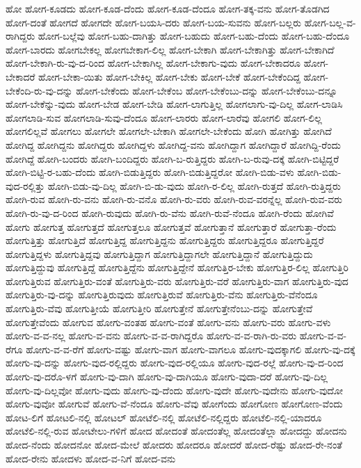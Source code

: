 {ಹೋ
ಹೋಗ-ಕೂಡದು
ಹೋಗ-ಕೂಡ-ದೆಂದು
ಹೋಗ-ಕೂಡ-ದೆಂದೂ
ಹೋಗ-ತಕ್ಕ-ವನು
ಹೋಗ-ತೊಡಗಿದ
ಹೋಗ-ದಂತೆ
ಹೋಗದೆ
ಹೋಗದೇ
ಹೋಗ-ಬಯಸಿ-ದರು
ಹೋಗ-ಬಯ-ಸುವನು
ಹೋಗ-ಬಲ್ಲರು
ಹೋಗ-ಬಲ್ಲ-ವ-ರಾಗಿದ್ದರು
ಹೋಗ-ಬಲ್ಲೆವು
ಹೋಗ-ಬಹು-ದಾಗಿತ್ತು
ಹೋಗ-ಬಹುದು
ಹೋಗ-ಬಹು-ದೆಂದು
ಹೋಗ-ಬಹು-ದೆಂದೂ
ಹೋಗ-ಬಾರದು
ಹೋಗಬೇಕಲ್ಲ
ಹೋಗಬೇಕಾಗ-ಲಿಲ್ಲ
ಹೋಗ-ಬೇಕಾಗಿ
ಹೋಗ-ಬೇಕಾಗಿತ್ತು
ಹೋಗ-ಬೇಕಾಗಿದೆ
ಹೋಗ-ಬೇಕಾಗಿ-ರು-ವು-ದ-ರಿಂದ
ಹೋಗ-ಬೇಕಾಗಿಲ್ಲ
ಹೋಗ-ಬೇಕಾಗು-ವುದು
ಹೋಗ-ಬೇಕಾದರೂ
ಹೋಗ-ಬೇಕಾದರೆ
ಹೋಗ-ಬೇಕಾ-ಯಿತು
ಹೋಗ-ಬೇಕಿಲ್ಲ
ಹೋಗ-ಬೇಕು
ಹೋಗ-ಬೇಕೆ
ಹೋಗ-ಬೇಕೆಂದಿದ್ದ
ಹೋಗ-ಬೇಕೆಂದಿ-ರು-ವು-ದನ್ನು
ಹೋಗ-ಬೇಕೆಂದು
ಹೋಗ-ಬೇಕೆಂಬ
ಹೋಗ-ಬೇಕೆಂಬು-ದನ್ನು
ಹೋಗ-ಬೇಕೆಂಬು-ದನ್ನೂ
ಹೋಗ-ಬೇಕೆನ್ನು-ವುದು
ಹೋಗ-ಬೇಡ
ಹೋಗ-ಬೇಡಿ
ಹೋಗ-ಲಾಗುತ್ತಿಲ್ಲ
ಹೋಗಲಾಗು-ವು-ದಿಲ್ಲ
ಹೋಗ-ಲಾಡಿಸಿ
ಹೋಗಲಾಡಿ-ಸುವ
ಹೋಗಲಾಡಿ-ಸುವು-ದೆಂದೂ
ಹೋಗ-ಲಾರರು
ಹೋಗ-ಲಾರೆವು
ಹೋಗಲಿ
ಹೋಗ-ಲಿಲ್ಲ
ಹೋಗಲಿಲ್ಲವೆ
ಹೋಗಲು
ಹೋಗಲೇ
ಹೋಗಲೇ-ಬೇಕಾಗಿ
ಹೋಗಲೇ-ಬೇಕೆಂದು
ಹೋಗಿ
ಹೋಗಿತ್ತು
ಹೋಗಿದೆ
ಹೋಗಿದ್ದ
ಹೋಗಿದ್ದನು
ಹೋಗಿದ್ದರು
ಹೋಗಿದ್ದಳು
ಹೋಗಿದ್ದ-ವನು
ಹೋಗಿದ್ದಾಗ
ಹೋಗಿದ್ದಾರೆ
ಹೋಗಿದ್ದಿ-ರೆಂದು
ಹೋಗಿದ್ದೆ
ಹೋಗಿ-ಬಂದರು
ಹೋಗಿ-ಬಂದಿದ್ದರು
ಹೋಗಿ-ಬ-ರುತ್ತಿದ್ದರು
ಹೋಗಿ-ಬ-ರುವು-ದಕ್ಕೆ
ಹೋಗಿ-ಬಿಟ್ಟಿದ್ದರೆ
ಹೋಗಿ-ಬಿಟ್ಟಿ-ರ-ಬಹು-ದೆಂದು
ಹೋಗಿ-ಬಿಡುತ್ತಿದ್ದರು
ಹೋಗಿ-ಬಿಡುತ್ತಿದ್ದರೋ
ಹೋಗಿ-ಬಿಡು-ವಳು
ಹೋಗಿ-ಬಿಡು-ವುದ-ರಲ್ಲಿತ್ತು
ಹೋಗಿ-ಬಿಡು-ವು-ದಿಲ್ಲ
ಹೋಗಿ-ಬಿ-ಡು-ವುದು
ಹೋಗಿ-ರ-ಲಿಲ್ಲ
ಹೋಗಿ-ರುತ್ತದೆ
ಹೋಗಿ-ರುತ್ತಿದ್ದರು
ಹೋಗಿ-ರುವ
ಹೋಗಿ-ರು-ವನು
ಹೋಗಿ-ರು-ವನೊ
ಹೋಗಿ-ರು-ವರು
ಹೋಗಿ-ರುವ-ವರನ್ನೆಲ್ಲ
ಹೋಗಿ-ರುವ-ವರು
ಹೋಗಿ-ರು-ವು-ದ-ರಿಂದ
ಹೋಗಿ-ರುವುದು
ಹೋಗಿ-ರು-ವೆನು
ಹೋಗಿ-ರುವೆ-ನೆಂದೂ
ಹೋಗಿ-ರೆಂದು
ಹೋಗಿವೆ
ಹೋಗು
ಹೋಗುತ್ತ
ಹೋಗುತ್ತದೆ
ಹೋಗುತ್ತಲೂ
ಹೋಗುತ್ತವೆ
ಹೋಗುತ್ತಾನೆ
ಹೋಗುತ್ತಾರೆ
ಹೋಗುತ್ತಾ-ರೆಂದು
ಹೋಗುತ್ತಿತ್ತು
ಹೋಗುತ್ತಿದೆ
ಹೋಗುತ್ತಿದ್ದ
ಹೋಗುತ್ತಿದ್ದನು
ಹೋಗುತ್ತಿದ್ದರು
ಹೋಗುತ್ತಿದ್ದರೂ
ಹೋಗುತ್ತಿದ್ದರೆ
ಹೋಗುತ್ತಿದ್ದಳು
ಹೋಗುತ್ತಿದ್ದವು
ಹೋಗುತ್ತಿದ್ದಾಗ
ಹೋಗುತ್ತಿದ್ದಾಗಲೇ
ಹೋಗುತ್ತಿದ್ದಾನೆ
ಹೋಗುತ್ತಿದ್ದುದು
ಹೋಗುತ್ತಿದ್ದುವು
ಹೋಗುತ್ತಿದ್ದೆ
ಹೋಗುತ್ತಿದ್ದೆನು
ಹೋಗುತ್ತಿದ್ದೇನೆ
ಹೋಗುತ್ತಿರ-ಬೇಕು
ಹೋಗುತ್ತಿರ-ಲಿಲ್ಲ
ಹೋಗುತ್ತಿರಿ
ಹೋಗುತ್ತಿರುವ
ಹೋಗುತ್ತಿರು-ವಂತೆ
ಹೋಗುತ್ತಿರು-ವರು
ಹೋಗುತ್ತಿರು-ವರೆ
ಹೋಗುತ್ತಿರು-ವಾಗ
ಹೋಗುತ್ತಿರು-ವುದ
ಹೋಗುತ್ತಿರು-ವು-ದನ್ನು
ಹೋಗುತ್ತಿರುವುದು
ಹೋಗುತ್ತಿರುವೆ
ಹೋಗುತ್ತಿರು-ವೆನು
ಹೋಗುತ್ತಿರು-ವೆನೆಂದೂ
ಹೋಗುತ್ತಿರು-ವೆವು
ಹೋಗುತ್ತೀಯೆ
ಹೋಗುತ್ತೀರಿ
ಹೋಗುತ್ತೇನೆ
ಹೋಗುತ್ತೇನೆಂಬು-ದನ್ನು
ಹೋಗುತ್ತೇವೆ
ಹೋಗುತ್ತೇವೆಂದು
ಹೋಗುವ
ಹೋಗು-ವಂತಹ
ಹೋಗು-ವಂತೆ
ಹೋಗು-ವನು
ಹೋಗು-ವರು
ಹೋಗು-ವಳು
ಹೋಗು-ವ-ವ-ನಲ್ಲ
ಹೋಗು-ವ-ವನು
ಹೋಗು-ವ-ವ-ರಾಗಿದ್ದರೊ
ಹೋಗು-ವ-ವ-ರಾಗಿ-ರು-ವರು
ಹೋಗು-ವ-ವ-ರೆಗೂ
ಹೋಗು-ವ-ವ-ರೆಗೆ
ಹೋಗು-ವಷ್ಟು
ಹೋಗು-ವಾಗ
ಹೋಗು-ವಾಗಲೂ
ಹೋಗು-ವುದಕ್ಕಾಗಲಿ
ಹೋಗು-ವು-ದಕ್ಕೆ
ಹೋಗು-ವು-ದನ್ನು
ಹೋಗು-ವುದ-ರಲ್ಲಿದ್ದರು
ಹೋಗು-ವುದ-ರಲ್ಲಿಯೂ
ಹೋಗು-ವುದ-ರಲ್ಲೆ
ಹೋಗು-ವು-ದ-ರಿಂದ
ಹೋಗು-ವು-ದರೊ-ಳಗೆ
ಹೋಗು-ವು-ದಾಗಿ
ಹೋಗು-ವು-ದಾಗಿಯೂ
ಹೋಗು-ವುದಾ-ದರೆ
ಹೋಗು-ವು-ದಿಲ್ಲ
ಹೋಗು-ವು-ದಿಲ್ಲವೋ
ಹೋಗು-ವುದು
ಹೋಗು-ವು-ದೆಂದು
ಹೋಗು-ವುದೇ
ಹೋಗು-ವುದೇನು
ಹೋಗು-ವುದೋ
ಹೋಗು-ವುವೋ
ಹೋಗುವೆ
ಹೋಗು-ವೆ-ನೆಂದೂ
ಹೋಗು-ವೆವು
ಹೋಗೆಂದು
ಹೋಗೋಣ
ಹೋಗೋಣ-ವೆಂದು
ಹೋಟ-ಲಿಗೆ
ಹೋಟಲಿ-ನಲ್ಲಿ
ಹೋಟಲ್
ಹೋಟೆಲಿ-ನಲ್ಲಿ
ಹೋಟೆಲಿ-ನಲ್ಲಿದ್ದರು
ಹೋಟೆಲಿ-ನಲ್ಲಿ-ಯಾದರೂ
ಹೋಟೆಲಿ-ನಲ್ಲಿ-ರುವ
ಹೋಟೇಲು-ಗಳಿಗೆ
ಹೋದ
ಹೋದಂತೆ
ಹೋದಂತೆಲ್ಲ
ಹೋದಂತೆಲ್ಲಾ
ಹೋದದ್ದು
ಹೋದನು
ಹೋದ-ನೆಂದು
ಹೋದನೋ
ಹೋದ-ಮೇಲೆ
ಹೋದರು
ಹೋದರೂ
ಹೋದರೆ
ಹೋದ-ರೆಷ್ಟು
ಹೋದ-ರೇ-ನಂತೆ
ಹೋದ-ರೇನು
ಹೋದಳು
ಹೋದ-ವ-ನಿಗೆ
ಹೋದ-ವನು
}
